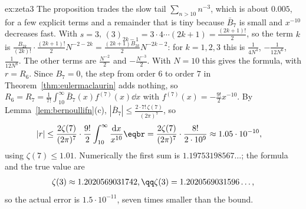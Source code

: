 \begin{solution}{ex:zeta3}
\idea The proposition trades the slow tail $\sum_{n>10}n^{-3}$, which is about $0.005$, for a few explicit terms and a remainder that is tiny because $\bar B_7$ is
small and $x^{-10}$ decreases fast.
\writeup With $s=3$, $(3)_{2k-1}=3\cdot4\cdots(2k+1)=\frac{(2k+1)!}2$, so the term $k$ is $\frac{B_{2k}}{(2k)!}\cdot\frac{(2k+1)!}2N^{-2-2k}=\frac{(2k+1)B_{2k}}2N^{-2k-2}$: for $k=1,2,3$
this is $\frac1{4N^4}$, $-\frac1{12N^6}$, $\frac1{12N^8}$. The other terms are $\frac{N^{-2}}2$ and $-\frac{N^{-3}}2$. With $N=10$ this gives the formula, with $r=R_6$.
Since $B_7=0$, the step from order $6$ to order $7$ in Theorem~\ref{thm:eulermaclaurin} adds nothing, so $R_6=R_7=\frac1{7!}\int_{10}^\infty\bar B_7(x)f^{(7)}(x)\dd x$ with
$f^{(7)}(x)=-\frac{9!}2x^{-10}$. By Lemma~\ref{lem:bernoullifn}(c), $|\bar B_7|\le\frac{2\cdot7!\,\zeta(7)}{(2\pi)^7}$, so
\[
\begin{aligned}|r|&\le\frac{2\zeta(7)}{(2\pi)^7}\cdot\frac{9!}2\int_{10}^\infty\frac{\mathrm dx}{x^{10}}\eqbr=\frac{2\zeta(7)}{(2\pi)^7}\cdot\frac{8!}{2\cdot10^9}\approx1.05\cdot10^{-10},\end{aligned}
\]
using $\zeta(7)\le1.01$. Numerically the first sum is $1.19753198567\ldots$; the formula and the true value are
\[
\begin{gathered}\zeta(3)\approx1.2020569031742,\qq\zeta(3)=1.2020569031596\ldots,\end{gathered}
\]
so the actual error is $1.5\cdot10^{-11}$, seven times smaller than the bound.
\end{solution}

